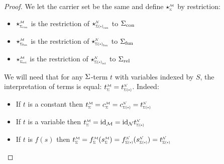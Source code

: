 \begin{proof}
    We let the carrier set be the same and 
    define $\intp{\Si}{\MM}$ by restriction:
    \begin{itemize}
        \item $\intp{\const{\Si}}{\MM}$ is
        the restriction of $\intp{\const{\Si(*)}}{\NN}$ to ${\Sigma}_\mathrm{con}$
        \item $\intp{\func{\Si}}{\MM}$ is
        the restriction of $\intp{\func{\Si(*)}}{\NN}$ to ${\Sigma}_\mathrm{fun}$
        \item $\intp{\rel{\Si}}{\MM}$ is
        the restriction of $\intp{\rel{\Si(*)}}{\NN}$ to ${\Sigma}_\mathrm{rel}$
    \end{itemize}
    We will need that for any $\Sigma$-term $t$ with variables indexed by $S$,
    the  interpretation of terms is equal:
    $\subintp{\Si}{\MM}{t} = \subintp{\Si(*)}{\NN}{t}$.
    Indeed:
    \begin{itemize}
        \item If $t$ is a constant then 
        $\subintp{\Si}{\MM}{t} = \subintp{\Si}{\MM}{c} =
        \subintp{\Si(*)}{\NN}{c} = \subintp{\Si(*)}{\NN}{t}$
        \item If $t$ is a variable then 
        $\subintp{\Si}{\MM}{t} = \id{{\MM}} =
        \id{{\NN}}
        \subintp{\Si(*)}{\NN}{t}$
        \item If $t$ is $f(s)$ then 
        $\subintp{\Si}{\MM}{t} = \subintp{\Si}{\MM}{f}(\subintp{\Si}{\MM}{s}) =
        \subintp{\Si(*)}{\NN}{f}(\subintp{\Si(*)}{\NN}{s}) = \subintp{\Si(*)}{\NN}{t}$
    \end{itemize}
    

\end{proof}
